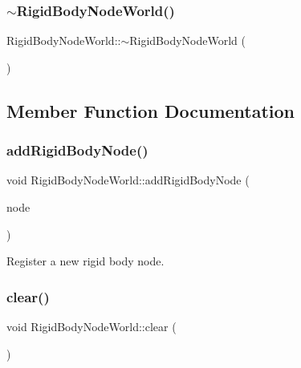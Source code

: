 \subsubsection{\texorpdfstring{$\sim$\+Rigid\+Body\+Node\+World()}{~RigidBodyNodeWorld()}}
{\footnotesize\ttfamily Rigid\+Body\+Node\+World\+::$\sim$\+Rigid\+Body\+Node\+World (\begin{DoxyParamCaption}{ }\end{DoxyParamCaption})\hspace{0.3cm}{\ttfamily [default]}}



\subsection{Member Function Documentation}
\mbox{\label{class_rigid_body_node_world_a1dc9da65de6b73fe78b08523eb7c6d5f}} 
\subsubsection{\texorpdfstring{add\+Rigid\+Body\+Node()}{addRigidBodyNode()}}
{\footnotesize\ttfamily void Rigid\+Body\+Node\+World\+::add\+Rigid\+Body\+Node (\begin{DoxyParamCaption}\item[{\mbox{\hyperlink{class_rigid_body_node}{Rigid\+Body\+Node}} $\ast$}]{node }\end{DoxyParamCaption})}



Register a new rigid body node. 

\mbox{\label{class_rigid_body_node_world_a3795fdb1b75c0da1286627e2c9b63830}} 
\subsubsection{\texorpdfstring{clear()}{clear()}}
{\footnotesize\ttfamily void Rigid\+Body\+Node\+World\+::clear (\begin{DoxyParamCaption}{ }\end{DoxyParamCaption})}



